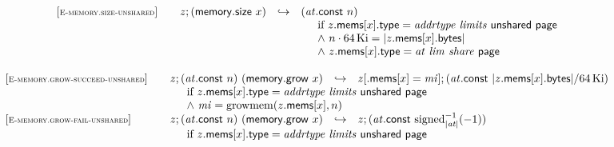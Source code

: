 \vspace{1ex}

$$
\begin{array}[t]{@{}lrcl@{}l@{}}
{[\textsc{\scriptsize E{-}memory.size{-}unshared}]} \quad & z ; (\mathsf{memory{.}size}~x) & \hookrightarrow & ({\mathit{at}}{.}\mathsf{const}~n) &  \\
&&& \multicolumn{2}{@{}l@{}}{\quad
\quad
\begin{array}[t]{@{}l@{}}
\mbox{if}~ z{.}\mathsf{mems}{}[x]{.}\mathsf{type} = {\mathit{addrtype}}~{\mathit{limits}}~\mathsf{unshared}~\mathsf{page} \\
{\land}~ n \cdot 64 \, {\mathrm{Ki}} = {|z{.}\mathsf{mems}{}[x]{.}\mathsf{bytes}|} \\
{\land}~ z{.}\mathsf{mems}{}[x]{.}\mathsf{type} = {\mathit{at}}~{\mathit{lim}}~{\mathit{share}}~\mathsf{page} \\
\end{array}
} \\
\end{array}
$$

$$
\begin{array}[t]{@{}lrcl@{}l@{}}
{[\textsc{\scriptsize E{-}memory.grow{-}succeed{-}unshared}]} \quad & z ; ({\mathit{at}}{.}\mathsf{const}~n)~(\mathsf{memory{.}grow}~x) & \hookrightarrow & z{}[{.}\mathsf{mems}{}[x] = {\mathit{mi}}] ; ({\mathit{at}}{.}\mathsf{const}~{|z{.}\mathsf{mems}{}[x]{.}\mathsf{bytes}|} / 64 \, {\mathrm{Ki}}) &  \\
& \multicolumn{4}{@{}l@{}}{\quad
\quad
\begin{array}[t]{@{}l@{}}
\mbox{if}~ z{.}\mathsf{mems}{}[x]{.}\mathsf{type} = {\mathit{addrtype}}~{\mathit{limits}}~\mathsf{unshared}~\mathsf{page} \\
{\land}~ {\mathit{mi}} = {\mathrm{growmem}}(z{.}\mathsf{mems}{}[x], n) \\
\end{array}
} \\
{[\textsc{\scriptsize E{-}memory.grow{-}fail{-}unshared}]} \quad & z ; ({\mathit{at}}{.}\mathsf{const}~n)~(\mathsf{memory{.}grow}~x) & \hookrightarrow & z ; ({\mathit{at}}{.}\mathsf{const}~{{{{\mathrm{signed}}}_{{|{\mathit{at}}|}}^{{-1}}}}{({-1})}) &  \\
& \multicolumn{4}{@{}l@{}}{\quad
\quad \mbox{if}~ z{.}\mathsf{mems}{}[x]{.}\mathsf{type} = {\mathit{addrtype}}~{\mathit{limits}}~\mathsf{unshared}~\mathsf{page}
} \\
\end{array}
$$

